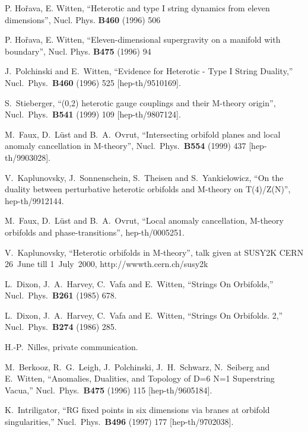 \documentclass[a4paper,12pt,twoside]{article}
\numberwithin{equation}{section}
\begin{document}
\begin{thebibliography}{xx}
  
 P. Ho\v{r}ava, E. Witten, ``Heterotic and type I string
  dynamics from eleven dimensions'', Nucl. Phys. {\bf B460} (1996) 506
  
 P. Ho\v{r}ava, E. Witten, ``Eleven-dimensional
  supergravity on a manifold with boundary'', Nucl. Phys. {\bf B475}
  (1996) 94
  
 J.~Polchinski and E.~Witten, ``Evidence for
  Heterotic - Type I String Duality,'' Nucl.\ Phys.\ {\bf B460} (1996)
  525 [hep-th/9510169].
  
 S.~Stieberger, ``(0,2) heterotic gauge couplings
  and their M-theory origin'', Nucl.\ Phys.\ {\bf B541} (1999) 109
  [hep-th/9807124].
  
 M.~Faux, D.~L\"ust and B.~A.~Ovrut, ``Intersecting
  orbifold planes and local anomaly cancellation in M-theory'', Nucl.\ 
  Phys.\ {\bf B554} (1999) 437 [hep-th/9903028].
  
 V.~Kaplunovsky, J.~Sonnenschein, S.~Theisen and
  S.~Yankielowicz, ``On the duality between perturbative heterotic
  orbifolds and M-theory on T(4)/Z(N)'', hep-th/9912144.
  
 M.~Faux, D.~L\"ust and B.~A.~Ovrut, ``Local anomaly
  cancellation, M-theory orbifolds and phase-transitions'',
  hep-th/0005251.
  
 V.~Kaplunovsky, ``Heterotic orbifolds in
  M-theory'', talk given at SUSY2K CERN 26~June till 1~July~2000,
  http://wwwth.cern.ch/susy2k
  
 L.~Dixon, J.~A.~Harvey, C.~Vafa and E.~Witten,
  ``Strings On Orbifolds,'' Nucl.\ Phys.\ {\bf B261} (1985) 678.
  
 L.~Dixon, J.~A.~Harvey, C.~Vafa and E.~Witten,
  ``Strings On Orbifolds. 2,'' Nucl.\ Phys.\ {\bf B274} (1986) 285.

 H.-P.~Nilles, private communication.
  
 M.~Berkooz, R.~G.~Leigh, J.~Polchinski,
  J.~H.~Schwarz, N.~Seiberg and E.~Witten, ``Anomalies, Dualities, and
  Topology of D=6 N=1 Superstring Vacua,'' Nucl.\ Phys.\ {\bf B475}
  (1996) 115 [hep-th/9605184].
  
 K.~Intriligator, ``RG fixed points in six
  dimensions via branes at orbifold singularities,'' Nucl.\ Phys.\ 
  {\bf B496} (1997) 177 [hep-th/9702038].
  

\end{thebibliography}
\end{document}
